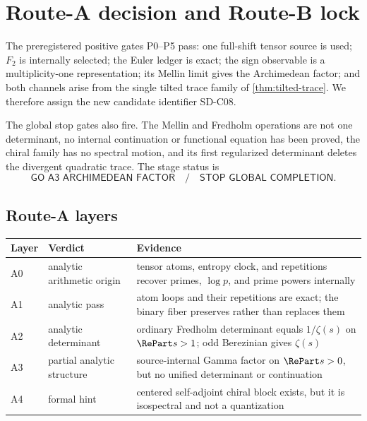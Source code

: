 \section{Route-A decision and Route-B lock}
\label{sec:route}

The preregistered positive gates P0--P5 pass: one full-shift tensor source is
used; $F_2$ is internally selected; the Euler ledger is exact; the sign
observable is a multiplicity-one representation; its Mellin limit gives the
Archimedean factor; and both channels arise from the single tilted trace
family of \cref{thm:tilted-trace}. We therefore assign the new candidate
identifier SD-C08.

The global stop gates also fire. The Mellin and Fredholm operations are not
one determinant, no internal continuation or functional equation has been
proved, the chiral family has no spectral motion, and its first regularized
determinant deletes the divergent quadratic trace. The stage status is
\[
 \boxed{\textsf{GO A3 ARCHIMEDEAN FACTOR}
 \quad/\quad
 \textsf{STOP GLOBAL COMPLETION}.}
\]

\subsection{Route-A layers}

\begin{center}
\small
\begin{tabularx}{0.99\textwidth}{L{0.08\textwidth}L{0.25\textwidth}X}
\toprule
Layer & Verdict & Evidence \\
\midrule
A0 & analytic arithmetic origin & tensor atoms, entropy clock, and repetitions recover primes, $\log p$, and prime powers internally \\
A1 & analytic pass & atom loops and their repetitions are exact; the binary fiber preserves rather than replaces them \\
A2 & analytic determinant & ordinary Fredholm determinant equals $1/\zeta(s)$ on $\RePart s>1$; odd Berezinian gives $\zeta(s)$ \\
A3 & partial analytic structure & source-internal Gamma factor on $\RePart s>0$, but no unified determinant or continuation \\
A4 & formal hint & centered self-adjoint chiral block exists, but it is isospectral and not a quantization \\
\bottomrule
\end{tabularx}
\end{center}

